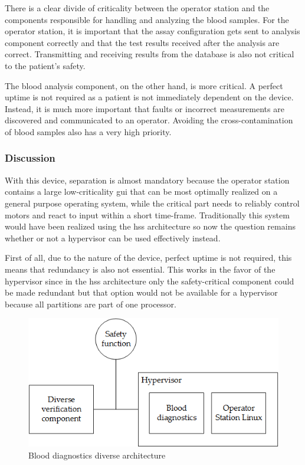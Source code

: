 There is a clear divide of criticality between the operator station and the components responsible for handling and analyzing the blood samples. For the operator station, it is important that the assay configuration gets sent to analysis component correctly and that the test results received after the analysis are correct. Transmitting and receiving results from the database is also not critical to the patient's safety.

The blood analysis component, on the other hand, is more critical. A perfect uptime is not required as a patient is not immediately dependent on the device. Instead, it is much more important that faults or incorrect measurements are discovered and communicated to an operator. Avoiding the cross-contamination of blood samples also has a very high priority.

\subsubsection{Discussion}
With this device, separation is almost mandatory because the operator station contains a large low-criticality \acrshort{gui} that can be most optimally realized on a general purpose operating system, while the critical part needs to reliably control motors and react to input within a short time-frame. Traditionally this system would have been realized using the \acrshort{hss} architecture so now the question remains whether or not a hypervisor can be used effectively instead.

First of all, due to the nature of the device, perfect uptime is not required, this means that redundancy is also not essential. This works in the favor of the hypervisor since in the \acrshort{hss} architecture only the safety-critical component could be made redundant but that option would not be available for a hypervisor because all partitions are part of one processor. 

\begin{figure}
\centering
\includegraphics[scale=0.75]{Figures/blood_diagnostics_arch}
\decoRule
\caption{Blood diagnostics diverse architecture}
\label{fig:blood_diagnostics_hv_arch}
\end{figure}

